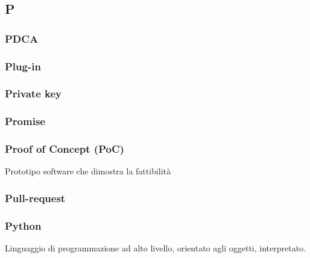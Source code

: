 \subsection*{\textbf{\hfill \Huge{P} \hfill}} 
\subsubsection*{PDCA}

\subsubsection*{Plug-in}

\subsubsection*{Private key}

\subsubsection*{Promise}

\subsubsection*{Proof of Concept (PoC)}
Prototipo software che dimostra la fattibilità 
\subsubsection*{Pull-request}

\subsubsection*{Python}
Linguaggio di programmazione ad alto livello, orientato agli oggetti, interpretato.
